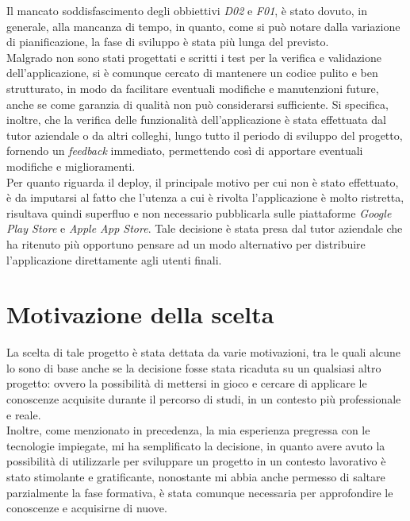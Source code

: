 \indent Il mancato soddisfascimento degli obbiettivi \emph{D02} e \emph{F01}, è stato dovuto, in generale, alla mancanza di tempo, in quanto, come si può notare dalla variazione di pianificazione, la fase di sviluppo è stata più lunga del previsto.\\
Malgrado non sono stati progettati e scritti i test per la verifica e validazione dell'applicazione, si è comunque cercato di mantenere un codice pulito e ben strutturato, in modo da facilitare eventuali modifiche e manutenzioni future, anche se come garanzia di qualità non può considerarsi sufficiente.
Si specifica, inoltre, che la verifica delle funzionalità  dell'applicazione è stata effettuata dal tutor aziendale o da altri colleghi, lungo tutto il periodo di sviluppo del progetto, fornendo un \emph{feedback} immediato, permettendo così di apportare eventuali modifiche e miglioramenti.\\
Per quanto riguarda il \gls{deploy}\glsoccur, il principale motivo per cui non è stato effettuato, è da imputarsi al fatto che l'utenza a cui è rivolta l'applicazione è molto ristretta, risultava quindi superfluo e non necessario pubblicarla sulle piattaforme \emph{Google Play Store} e \emph{Apple App Store}. Tale decisione è stata presa dal tutor aziendale che ha ritenuto più opportuno pensare ad un modo alternativo per distribuire l'applicazione direttamente agli utenti finali. \\

\section{Motivazione della scelta}
\label{sec:motivazione-scelta}

La scelta di tale progetto è stata dettata da varie motivazioni, tra le quali alcune lo sono di base anche se la decisione fosse stata ricaduta su un qualsiasi altro progetto: ovvero la possibilità di mettersi in gioco e cercare di applicare le conoscenze acquisite durante il percorso di studi, in un contesto più professionale e reale. \\
Inoltre, come menzionato in precedenza, la mia esperienza pregressa con le tecnologie impiegate, mi ha semplificato la decisione, in quanto avere avuto la possibilità di utilizzarle per sviluppare un progetto in un contesto lavorativo è stato stimolante e gratificante, nonostante mi abbia anche permesso di saltare parzialmente la fase formativa, è stata comunque necessaria per approfondire le conoscenze e acquisirne di nuove.\\
